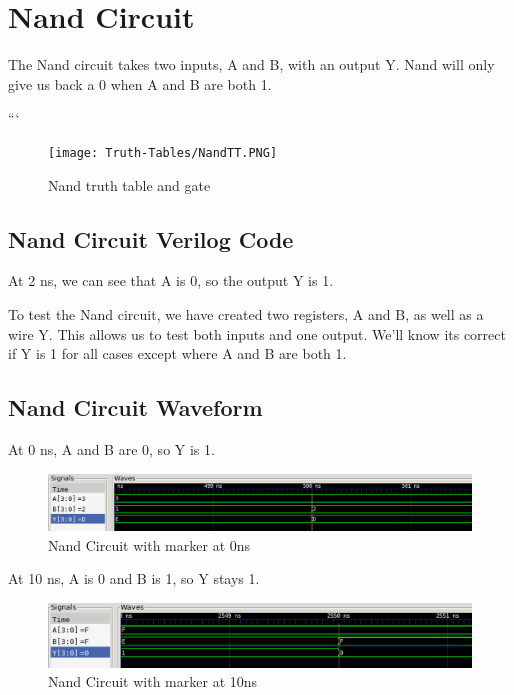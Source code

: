 \documentclass[12pt]{article}
\begin{document}
\section{Nand Circuit}
The Nand circuit takes two inputs, A and B, with an output Y. Nand will only give us back a 0 when A and B are both 1.

```\begin{figure}[H]
    \centering
    \texttt{[image: Truth-Tables/NandTT.PNG]}
    \caption{Nand truth table and gate}
    \label{fig:shift-table}
\end{figure}

\subsection{Nand Circuit Verilog Code}
At 2 ns, we can see that  A is 0, so the output Y is 1.


To test the Nand circuit, we have created two registers, A and B, as well as a wire Y. This allows us to test both inputs and one output. We'll know its correct if Y is 1 for all cases except where A and B are both 1.

\subsection{Nand Circuit Waveform}

At 0 ns, A and B are 0, so Y is 1.
\begin{figure}[H]
    \centering
    \includegraphics[width = 1.0\textwidth]{nand/nand_wave1.PNG}
    \caption{Nand Circuit with marker at 0ns}
    \label{fig:enter-label}
\end{figure}

At 10 ns, A is 0 and B is 1, so Y stays 1.
\begin{figure}[H]
    \centering
    \includegraphics[width = 1.0\textwidth]{nand/nand_wave2.PNG}
    \caption{Nand Circuit with marker at 10ns}
    \label{fig:enter-label}
\end{figure}
\end{document}
